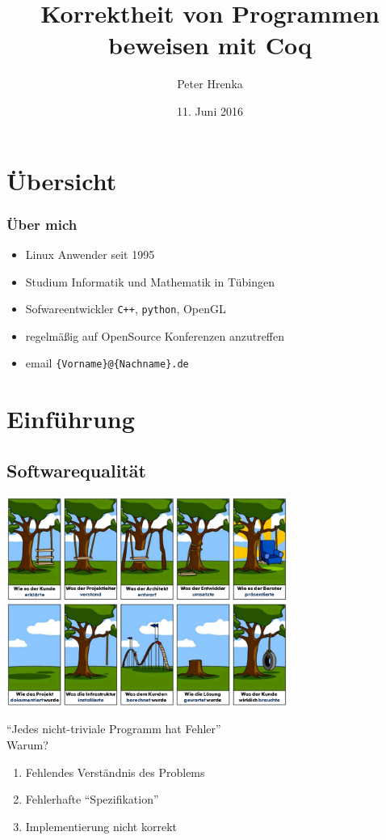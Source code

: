 \documentclass[aspectratio=169]{beamer}
\title{Korrektheit von Programmen beweisen mit Coq}
\institute{Linux Tag Tübingen 2016}
\author[P.Hrenka]{Peter Hrenka}
\date{11. Juni 2016}
\begin{document}
\begin{frame}
\titlepage
\end{frame}
\section*{Übersicht}
\begin{frame}
  \tableofcontents
\end{frame}
\begin{frame}
  \frametitle{Über mich}
  \begin{itemize}
    \item Linux Anwender seit 1995
    \item Studium Informatik und Mathematik in Tübingen
    \item Sofwareentwickler \texttt{C++}, \texttt{python}, OpenGL
    \item regelmäßig auf OpenSource Konferenzen anzutreffen
    \item email \tiny\texttt{\{Vorname\}@\{Nachname\}.de}
  \end{itemize}
\end{frame}
\section{Einführung}
\subsection{Softwarequalität}
\begin{frame}
  \begin{center}
    \includegraphics[width=9.2cm]{projekt-schaukel-baum.png}
  \end{center}
\end{frame}
\begin{frame}
  ``Jedes nicht-triviale Programm hat Fehler''\\
  \pause
  \vfill
  Warum?
  \pause
  \vfill
  \begin{enumerate}
    \item Fehlendes Verständnis des Problems
    \pause
    \item Fehlerhafte ``Spezifikation''
    \pause
    \item Implementierung nicht korrekt
  \end{enumerate}
\end{frame}
\end{document}
